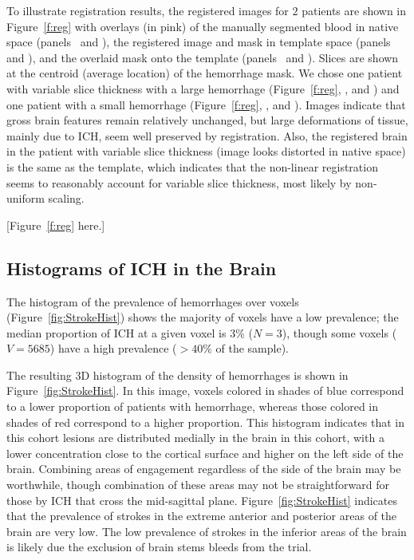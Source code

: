 \documentclass[10pt]{article}\usepackage[]{graphicx}\usepackage[]{color}
\begin{document}
To illustrate registration results, the registered images for $2$ patients are shown in Figure~\ref{f:reg} with overlays (in pink) of the manually segmented blood in native space (panels~\protect{} and \protect{}), the registered image and mask in template space (panels~\protect{} and \protect{}), and the overlaid mask onto the template (panels~\protect{} and \protect{}).  Slices are shown at the centroid (average location) of the hemorrhage mask.  We chose one patient with variable slice thickness with a large hemorrhage (Figure~\ref{f:reg}\protect{}, \protect{}, and \protect{}) and one patient with a small hemorrhage (Figure~\ref{f:reg}\protect{}, \protect{}, and \protect{}).  Images indicate that gross brain features remain relatively unchanged, but large deformations of tissue, mainly due to ICH, seem well preserved by registration.  Also, the registered brain in the patient with variable slice thickness (image looks distorted in native space) is the same as the template, which indicates that the non-linear registration seems to reasonably account for variable slice thickness, most likely by non-uniform scaling.

[Figure~\ref{f:reg} here.]


\subsection{Histograms of ICH in the Brain}




The histogram of the prevalence of hemorrhages over voxels (Figure~\ref{fig:StrokeHist}\protect{}) shows the majority of voxels have a low prevalence; the median proportion of ICH at a given voxel is 3\% ($N = 3$), though some voxels ($V = 5685$) have a high prevalence ($> 40\%$ of the sample).  


The resulting 3D histogram of the density of hemorrhages is shown in Figure~\ref{fig:StrokeHist}\protect{}.
In this image, voxels colored in shades of blue correspond to a lower proportion of
patients with hemorrhage, whereas those colored in shades of red correspond to a higher proportion. This histogram indicates that in this cohort lesions are
distributed medially in the brain in this cohort, with a lower concentration
close to the cortical surface and higher on the left side of the brain.  Combining areas of engagement regardless of the side of the brain may be worthwhile, though combination of these areas may not be straightforward for those by ICH that cross the mid-sagittal plane.  
Figure~\ref{fig:StrokeHist}\protect{} indicates that the prevalence of strokes in the extreme anterior and posterior areas of the brain are very low.  The low prevalence of strokes in the inferior areas of the brain is likely due the exclusion of brain stems bleeds from the trial.  
\end{document}
